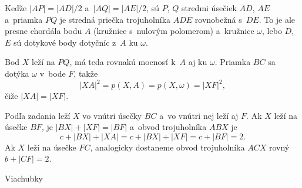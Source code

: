 {    Keďže $|AP| = |AD|/2$ a~$|AQ| = |AE|/2$, sú $P$, $Q$ stredmi úsečiek $AD$, $AE$ a~priamka $PQ$ je stredná priečka trojuholníka $ADE$ rovnobežná s~$DE$. To je ale presne chordála bodu $A$ (kružnice s~nulovým polomerom) a~kružnice $\omega$, lebo $D$, $E$ sú dotykové body dotyčníc z~$A$ ku $\omega$.

    Bod $X$ leží na $PQ$, má teda rovnakú mocnosť k~$A$ aj ku $\omega$. Priamka $BC$ sa dotýka $\omega$ v~bode $F$, takže
    $$
    |XA|^2 = p(X,A) = p(X,\omega) = |XF|^2,
    $$
    čiže $|XA| = |XF|$.

    Podľa zadania leží $X$ vo vnútri úsečky $BC$ a~vo vnútri nej leží aj $F$. Ak $X$ leží na úsečke $BF$, je $|BX| + |XF| = |BF|$ a~obvod trojuholníka $ABX$ je
    $$
    c + |BX| + |XA| = c + |BX| + |XF| = c + |BF| = 2.
    $$
    Ak $X$ leží na úsečke $FC$, analogicky dostaneme obvod trojuholníka $ACX$ rovný $b + |CF| = 2$.
}

\secc Viachubky

